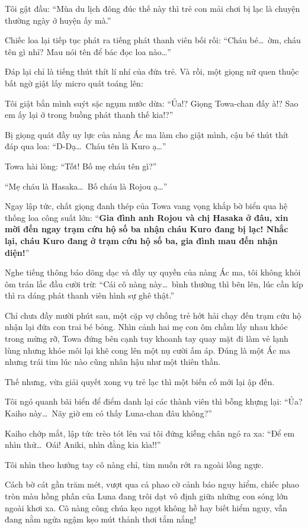 \documentclass[../main.tex]{subfiles}
\begin{document}
Tôi gật đầu: ``Mùa du lịch đông đúc thế này thì trẻ con mải chơi bị lạc là chuyện thường ngày ở huyện ấy mà.''

Chiếc loa lại tiếp tục phát ra tiếng phát thanh viên bối rối: ``Cháu bé\dots\ ờm, cháu tên gì nhỉ? Mau nói tên để bác đọc loa nào\dots''

Đáp lại chỉ là tiếng thút thít lí nhí của đứa trẻ. Và rồi, một giọng nữ quen thuộc bất ngờ giật lấy micro quát toáng lên:

Tôi giật bắn mình suýt sặc ngụm nước dừa: ``Ủa!? Giọng Towa-chan đấy à!? Sao em ấy lại ở trong buồng phát thanh thế kia!?''

Bị giọng quát đầy uy lực của nàng Ác ma làm cho giật mình, cậu bé thút thít đáp qua loa: ``D-Dạ\dots\ Cháu tên là Kuro ạ\dots''

Towa hài lòng: ``Tốt! Bố mẹ cháu tên gì?''

``Mẹ cháu là Hasaka\dots\ Bố cháu là Rojou ạ\dots''

Ngay lập tức, chất giọng đanh thép của Towa vang vọng khắp bờ biển qua hệ thống loa công suất lớn: ``\textbf{Gia đình anh Rojou và chị Hasaka ở đâu, xin mời đến ngay trạm cứu hộ số ba nhận cháu Kuro đang bị lạc! Nhắc lại, cháu Kuro đang ở trạm cứu hộ số ba, gia đình mau đến nhận diện!}''

Nghe tiếng thông báo dõng dạc và đầy uy quyền của nàng Ác ma, tôi không khỏi ôm trán lắc đầu cười trừ: ``Cái cô nàng này\dots\ bình thường thì bẽn lẽn, lúc cần kíp thì ra dáng phát thanh viên hình sự ghê thật.''

Chỉ chưa đầy mười phút sau, một cặp vợ chồng trẻ hớt hải chạy đến trạm cứu hộ nhận lại đứa con trai bé bỏng. Nhìn cảnh hai mẹ con ôm chầm lấy nhau khóc trong mừng rỡ, Towa đứng bên cạnh tuy khoanh tay quay mặt đi làm vẻ lạnh lùng nhưng khóe môi lại khẽ cong lên một nụ cười ấm áp. Đúng là một Ác ma nhưng trái tim lúc nào cũng nhân hậu như một thiên thần.

Thế nhưng, vừa giải quyết xong vụ trẻ lạc thì một biến cố mới lại ập đến.

Tôi ngó quanh bãi biển để điểm danh lại các thành viên thì bỗng khựng lại: ``Ủa? Kaiho này\dots\ Nãy giờ em có thấy Luna-chan đâu không?''

Kaiho chớp mắt, lập tức trèo tót lên vai tôi đứng kiễng chân ngó ra xa: ``Để em nhìn thử\dots\ Oái! Aniki, nhìn đằng kia kìa!!''

Tôi nhìn theo hướng tay cô nàng chỉ, tim muốn rớt ra ngoài lồng ngực.

Cách bờ cát gần trăm mét, vượt qua cả phao cờ cảnh báo nguy hiểm, chiếc phao tròn màu hồng phấn của Luna đang trôi dạt vô định giữa những con sóng lớn ngoài khơi xa. Cô nàng công chúa kẹo ngọt không hề hay biết hiểm nguy, vẫn đang nằm ngửa ngậm kẹo mút thảnh thơi tắm nắng!
\end{document}
